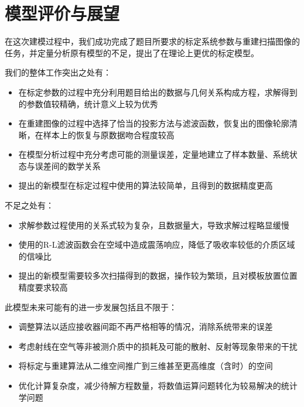 \section{模型评价与展望}
在这次建模过程中，我们成功完成了题目所要求的标定系统参数与重建扫描图像的任务，并定量分析原有模型的不足，提出了在理论上更优的标定模型。

我们的整体工作突出之处有：
\begin{itemize}
  \item 在标定参数的过程中充分利用题目给出的数据与几何关系构成方程，求解得到的参数值较精确，统计意义上较为优秀
  \item 在重建图像的过程中选择了恰当的投影方法与滤波函数，恢复出的图像轮廓清晰，在样本上的恢复与原数据吻合程度较高
  \item 在模型分析过程中充分考虑可能的测量误差，定量地建立了样本数量、系统状态与误差间的数学关系
  \item 提出的新模型在标定过程中使用的算法较简单，且得到的数据精度更高
\end{itemize}

不足之处有：
\begin{itemize}
  \item 求解参数过程使用的关系式较为复杂，且数据量大，导致求解过程略显缓慢
  \item 使用的R-L滤波函数会在空域中造成震荡响应，降低了吸收率较低的介质区域的信噪比
  \item 提出的新模型需要较多次扫描得到的数据，操作较为繁琐，且对模板放置位置精度要求较高
\end{itemize}

此模型未来可能有的进一步发展包括且不限于：
\begin{itemize}
  \item 调整算法以适应接收器间距不再严格相等的情况，消除系统带来的误差
  \item 考虑射线在空气等非被测介质中的损耗及可能的散射、反射等现象带来的干扰
  \item 将标定与重建算法从二维空间推广到三维甚至更高维度（含时）的空间
  \item 优化计算复杂度，减少待解方程数量，将数值运算问题转化为较易解决的统计学问题
\end{itemize}